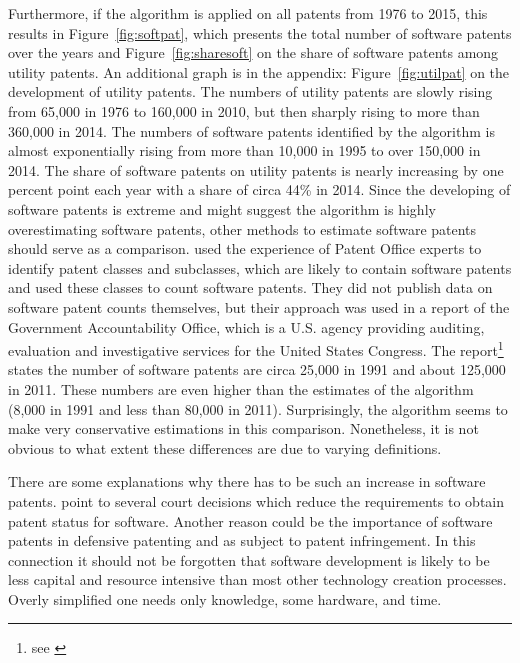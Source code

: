 \documentclass[12pt, a4paper]{scrartcl}
\theoremstyle{definition}
\begin{document}
Furthermore, if the algorithm is applied on all patents from 1976 to 2015, this
results in Figure~\ref{fig:softpat}, which presents the total number of
software patents over the years and Figure~\ref{fig:sharesoft} on the share of
software patents among utility patents. An additional graph is in the appendix:
Figure~\ref{fig:utilpat} on the development of utility patents. The numbers of
utility patents are slowly rising from 65,000 in 1976 to 160,000 in 2010, but
then sharply rising to more than 360,000 in 2014. The numbers of software
patents identified by the algorithm is almost exponentially rising from more
than 10,000 in 1995 to over 150,000 in 2014. The share of software patents on
utility patents is nearly increasing by one percent point each year with a
share of circa 44\% in 2014. Since the developing of software patents is
extreme and might suggest the algorithm is highly overestimating software
patents, other methods to estimate software patents should serve as a
comparison. \citet{graham2013smart} used the experience of Patent Office
experts to identify patent classes and subclasses, which are likely to contain
software patents and used these classes to count software patents. They did not
publish data on software patent counts themselves, but their approach was used
in a report of the Government Accountability Office, which is a U.S. agency
providing auditing, evaluation and investigative services for the United States
Congress. The report\footnote{see \citet{usgao2013}} states the number of
software patents are circa 25,000 in 1991 and about 125,000 in 2011. These
numbers are even higher than the estimates of the algorithm (8,000 in 1991 and
less than 80,000 in 2011). Surprisingly, the algorithm seems to make very
conservative estimations in this comparison. Nonetheless, it is not obvious to
what extent these differences are due to varying definitions.

There are some explanations why there has to be such an increase in software
patents. \citet{bessen2007empirical} point to several court decisions which
reduce the requirements to obtain patent status for software. Another reason
could be the importance of software patents in defensive patenting and as
subject to patent infringement. In this connection it should not be forgotten
that software development is likely to be less capital and resource intensive
than most other technology creation processes. Overly simplified one needs only
knowledge, some hardware, and time.

\end{document}
